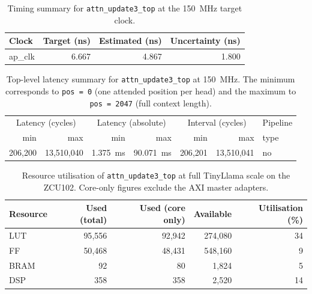 \begin{table}[H]
  \centering
  \begin{tabular}{lrrr}
    \toprule
    Clock & Target (ns) & Estimated (ns) & Uncertainty (ns) \\
    \midrule
    ap\_clk & 6.667 & 4.867 & 1.800 \\
    \bottomrule
  \end{tabular}
  \caption{Timing summary for \texttt{attn\_update3\_top} at the
           \SI{150}{\mega\hertz} target clock.}
  \label{tab:attn_u3_timing}
\end{table}

\begin{table}[H]
  \centering
  \begin{tabular}{rrrrrrl}
    \toprule
    \multicolumn{2}{c}{Latency (cycles)} &
    \multicolumn{2}{c}{Latency (absolute)} &
    \multicolumn{2}{c}{Interval (cycles)} & Pipeline \\
    min & max & min & max & min & max & type \\
    \midrule
    206{,}200 & 13{,}510{,}040 &
    \SI{1.375}{\milli\second} & \SI{90.071}{\milli\second} &
    206{,}201 & 13{,}510{,}041 & no \\
    \bottomrule
  \end{tabular}
  \caption{Top-level latency summary for \texttt{attn\_update3\_top} at
           \SI{150}{\mega\hertz}. The minimum corresponds to
           \texttt{pos\,=\,0} (one attended position per head) and the
           maximum to \texttt{pos\,=\,2047} (full context length).}
  \label{tab:attn_u3_top_latency}
\end{table}

\begin{table}[H]
  \centering
  \begin{tabular}{lrrrr}
    \toprule
    Resource & Used (total) & Used (core only) & Available & Utilisation (\%) \\
    \midrule
    LUT  & 95{,}556 & 92{,}942 & 274{,}080 & 34 \\
    FF   & 50{,}468 & 48{,}431 & 548{,}160 &  9 \\
    BRAM &       92 &       80 &   1{,}824 &  5 \\
    DSP  &      358 &      358 &   2{,}520 & 14 \\
    \bottomrule
  \end{tabular}
  \caption{Resource utilisation of \texttt{attn\_update3\_top} at full
           TinyLlama scale on the ZCU102. Core-only figures exclude the
           AXI master adapters.}
  \label{tab:attn_u3_resources}
\end{table}

